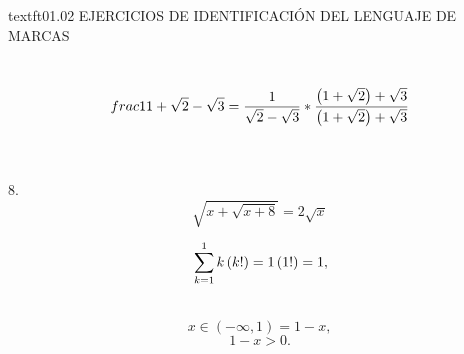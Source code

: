 \documentclass[10]{article}
\begin{document}
	\begin{tittle}
		\LARGE textft{01.02 EJERCICIOS DE IDENTIFICACIÓN DEL LENGUAJE DE MARCAS}
	\end{tittle}

\\ 
\begin{equation}
	\\frac{1}{1+\sqrt{2}-\sqrt{3}}=\frac{1}{\sqrt{2}-\sqrt{3}}*\frac{\left(1+\sqrt{2}\right)+\sqrt{3}}{\left(1+\sqrt{2}\right)+\sqrt{3}}
\end {equation}

\\\\8.  \begin{equation} \sqrt{x+\sqrt{x+8}}=2\sqrt{x} \end{equation} 

\begin{equation}
	\\\sum_{k=1}^{1}k\left(k!\right)=1\left(1!\right)=1,
\end{equation}

\\ \begin{equation} x\in\left(-\infty,1\right)=1-x, \end{equation}  \begin{equation} 1-x>0.\end{equation} 
\end{document}
